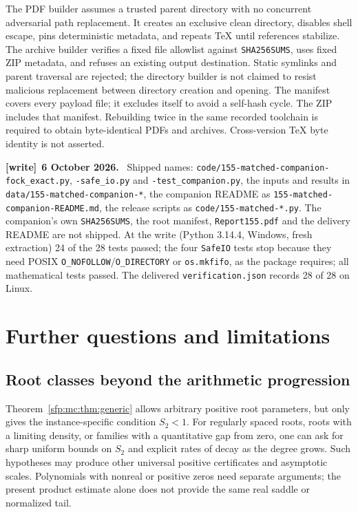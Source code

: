 \documentclass[11pt,letterpaper]{article}
\numberwithin{equation}{section}
\theoremstyle{definition}\newtheorem{definition}[theorem]{Definition}
\theoremstyle{remark}\newtheorem{remark}[theorem]{Remark}
\newcommand{\file}[1]{\nolinkurl{#1}}
\newenvironment{writenote}[1][]{\par\smallskip\begingroup\small
 \noindent\textbf{[write]}\if\relax\detokenize{#1}\relax\else~\textbf{#1.}\fi\ }%
 {\par\endgroup\smallskip}
\begin{document}
The PDF builder assumes a trusted parent directory with no concurrent
adversarial path replacement. It creates an exclusive clean directory, disables
shell escape, pins deterministic metadata, and repeats TeX until
references stabilize. The archive builder verifies a fixed file
allowlist against \texttt{SHA256SUMS}, uses fixed ZIP metadata,
and refuses an existing output destination. Static symlinks and
parent traversal are rejected; the directory builder is not claimed
to resist malicious replacement between directory creation and opening.
The manifest covers
every payload file; it excludes itself to avoid a self-hash cycle.
The ZIP includes that manifest. Rebuilding twice in the same
recorded toolchain is required to obtain byte-identical PDFs and
archives. Cross-version TeX byte identity is not asserted.
\begin{writenote}[6 October 2026]
Shipped names: \file{code/155-matched-companion-fock_exact.py}, \file{-safe_io.py} and \file{-test_companion.py}, the inputs and results in \file{data/155-matched-companion-*}, the companion README as \file{155-matched-companion-README.md}, the release scripts as \file{code/155-matched-*.py}. The companion's own \file{SHA256SUMS}, the root manifest, \file{Report155.pdf} and the delivery README are not shipped. At the write (Python 3.14.4, Windows, fresh extraction) 24 of the 28 tests passed; the four \texttt{SafeIO} tests stop because they need POSIX \texttt{O\_NOFOLLOW}/\texttt{O\_DIRECTORY} or \texttt{os.mkfifo}, as the package requires; all mathematical tests passed. The delivered \file{verification.json} records 28 of 28 on Linux.
\end{writenote}

\section{Further questions and limitations}\label{sfp:mc:sec:future}

\subsection{Root classes beyond the arithmetic progression}\label{sfp:mc:sub:roots}
Theorem~\ref{sfp:mc:thm:generic} allows arbitrary positive root parameters,
but only gives the instance-specific condition $S_2<1$.
For regularly spaced roots, roots with a limiting density, or
families with a quantitative gap from zero, one can ask for
sharp uniform bounds on $S_2$ and explicit rates of decay as the
degree grows. Such hypotheses may produce other universal
positive certificates and asymptotic scales. Polynomials with
nonreal or positive zeros need separate arguments; the present
product estimate alone does not provide the same real saddle
or normalized tail.
\end{document}
